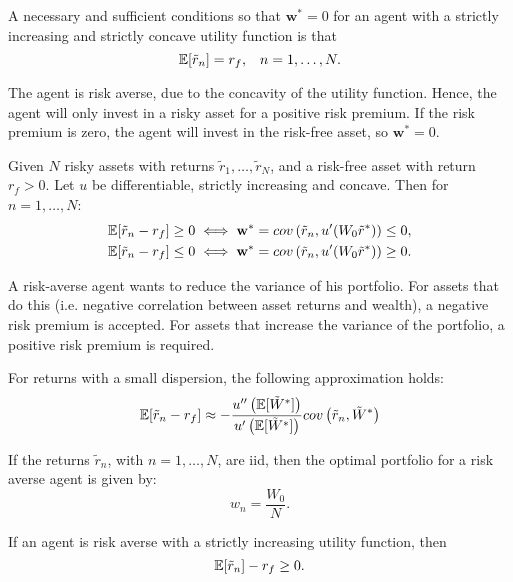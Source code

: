 \documentclass[twoside]{article}
\begin{document}
\begin{proposition}
 A necessary and sufficient conditions so that $\mathbf{w}^* = 0$ for an agent with a strictly increasing and strictly concave utility function is that
\[
    \mathbb{E}[\tilde{r}_n]  = r_f, \;\;\; n = 1, \dots, N.
\]
\begin{explanation}
    The agent is risk averse, due to the concavity of the utility function. Hence, the agent will only invest in a risky asset for a positive risk premium. If the risk premium is zero, the agent will invest in the risk-free asset, so $\mathbf{w}^* = 0$.
\end{explanation}
\end{proposition}

\begin{proposition}
    Given $N$ risky assets with returns $\tilde{r}_1, \dots, \tilde{r}_N$, and a risk-free asset with return $r_f > 0$. Let $u$ be differentiable, strictly increasing and concave. Then for $n = 1, \dots, N$:
    \begin{align*}
        \mathbb{E}[\tilde{r}_n - r_f] &\geq 0 \iff \mathbf{w}^* = cov\left(\tilde{r}_n, u'(W_0\tilde{r}^*)\right) \leq 0, \\
        \mathbb{E}[\tilde{r}_n - r_f] &\leq 0 \iff \mathbf{w}^* = cov\left(\tilde{r}_n, u'(W_0\tilde{r}^*)\right) \geq 0.
    \end{align*}
    \begin{explanation}
        A risk-averse agent wants to reduce the variance of his portfolio. For assets that do this (i.e. negative correlation between asset returns and wealth), a negative risk premium is accepted. For assets that increase the variance of the portfolio, a positive risk premium is required.
    \end{explanation}
\end{proposition}

For returns with a small dispersion, the following approximation holds:
\[
    \mathbb{E}[\tilde{r}_n - r_f] \approx - \frac{u''\left(\mathbb{E}[\tilde{W}^*]\right)}{u'\left(\mathbb{E}[\tilde{W}^*]\right)} cov\left(\tilde{r}_n, \tilde{W}^*\right)
\]


\begin{proposition}
    If the returns $\tilde{r}_n$, with $n = 1, \dots, N$, are iid, then the optimal portfolio for a risk averse agent is given by:
    \[
        w_n = \frac{W_0}{N}.
    \]
\end{proposition}

\begin{proposition}
    If an agent is risk averse with a strictly increasing utility function, then
    \[
        \mathbb{E}[\tilde{r}_n] - r_f \geq 0.
    \]
\end{proposition}
\end{document}
